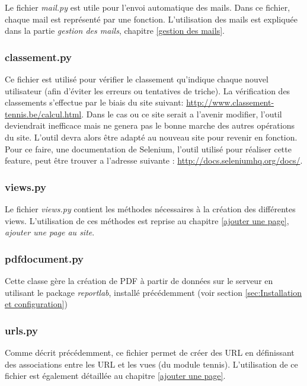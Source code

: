 Le fichier \textit{mail.py} est utile pour l'envoi automatique des mails. Dans ce fichier, chaque mail est représenté par une fonction. L'utilisation des mails est expliquée dans la partie \textit{gestion des mails}, chapitre \ref{gestion des mails}.

\subsubsection{classement.py} 

Ce fichier est utilisé pour vérifier le classement qu'indique chaque nouvel utilisateur (afin d'éviter les erreurs ou tentatives de triche). La vérification des classements s'effectue par le biais du site suivant: \url{http://www.classement-tennis.be/calcul.html}. Dans le cas ou ce site serait a l'avenir modifier, l'outil deviendrait inefficace mais ne genera pas le bonne marche des autres opérations du site. L'outil devra alors être adapté au nouveau site pour revenir en fonction. Pour ce faire, une documentation de Selenium, l'outil utilisé pour réaliser cette feature, peut être trouver a l'adresse suivante : \url{http://docs.seleniumhq.org/docs/}. 

\subsubsection{views.py}

Le fichier \textit{views.py} contient les méthodes nécessaires à la création des différentes views. L'utilisation de ces méthodes est reprise au chapitre \ref{ajouter une page}, \textit{ajouter une page au site}.

\subsubsection{pdfdocument.py}

Cette classe gère la création de PDF à partir de données sur le serveur en utilisant le package \textit{reportlab}, installé précédemment (voir section \ref{sec:Installation et configuration})

\subsubsection{urls.py}

Comme décrit précédemment, ce fichier permet de créer des URL en définissant des associations entre les URL et les vues (du module tennis). L'utilisation de ce fichier est également détaillée au chapitre \ref{ajouter une page}.